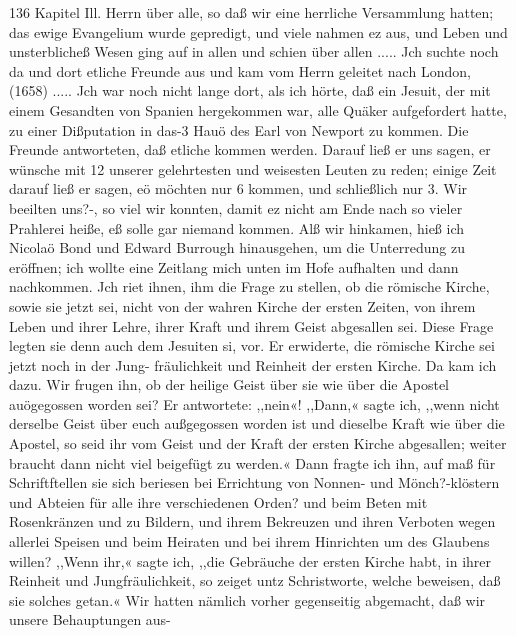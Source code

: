 136 Kapitel Ill.
Herrn über alle, so daß wir eine herrliche Versammlung hatten;
das ewige Evangelium wurde gepredigt, und viele nahmen ez
aus, und Leben und unsterblicheß Wesen ging auf in allen und
schien über allen .....
Jch suchte noch da und dort etliche Freunde aus und kam
vom Herrn geleitet nach London, (1658) .....
Jch war noch nicht lange dort, als ich hörte, daß ein Jesuit,
der mit einem Gesandten von Spanien hergekommen war, alle
Quäker aufgefordert hatte, zu einer Dißputation in das-3 Hauö des
Earl von Newport zu kommen. Die Freunde antworteten, daß
etliche kommen werden. Darauf ließ er uns sagen, er wünsche
mit 12 unserer gelehrtesten und weisesten Leuten zu reden; einige
Zeit darauf ließ er sagen, eö möchten nur 6 kommen, und schließlich
nur 3. Wir beeilten uns?-, so viel wir konnten, damit ez nicht am
Ende nach so vieler Prahlerei heiße, eß solle gar niemand kommen.
Alß wir hinkamen, hieß ich Nicolaö Bond und Edward Burrough
hinausgehen, um die Unterredung zu eröffnen; ich wollte eine
Zeitlang mich unten im Hofe aufhalten und dann nachkommen.
Jch riet ihnen, ihm die Frage zu stellen, ob die römische Kirche,
sowie sie jetzt sei, nicht von der wahren Kirche der ersten Zeiten,
von ihrem Leben und ihrer Lehre, ihrer Kraft und ihrem Geist
abgesallen sei. Diese Frage legten sie denn auch dem Jesuiten si,
vor. Er erwiderte, die römische Kirche sei jetzt noch in der Jung-
fräulichkeit und Reinheit der ersten Kirche. Da kam ich dazu.
Wir frugen ihn, ob der heilige Geist über sie wie über die Apostel
auögegossen worden sei? Er antwortete: ,,nein«! ,,Dann,« sagte
ich, ,,wenn nicht derselbe Geist über euch außgegossen worden ist
und dieselbe Kraft wie über die Apostel, so seid ihr vom Geist
und der Kraft der ersten Kirche abgesallen; weiter braucht dann
nicht viel beigefügt zu werden.« Dann fragte ich ihn, auf maß
für Schriftftellen sie sich beriesen bei Errichtung von Nonnen- und
Mönch?-klöstern und Abteien für alle ihre verschiedenen Orden?
und beim Beten mit Rosenkränzen und zu Bildern, und ihrem
Bekreuzen und ihren Verboten wegen allerlei Speisen und beim
Heiraten und bei ihrem Hinrichten um des Glaubens willen?
,,Wenn ihr,« sagte ich, ,,die Gebräuche der ersten Kirche habt, in
ihrer Reinheit und Jungfräulichkeit, so zeiget untz Schristworte,
welche beweisen, daß sie solches getan.« Wir hatten nämlich
vorher gegenseitig abgemacht, daß wir unsere Behauptungen aus-


